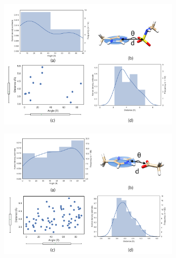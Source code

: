 \documentclass[a4paper, 12pt, openany]{book}
\begin{document}
\begin{figure}
    \centering
    \includegraphics[width=9cm]{Figures/Datamining/his_Nsulf.png}
    \caption{
    }
    \label{fig:my_label}
\end{figure}

\begin{figure}
    \centering
    \includegraphics[width=9cm]{Figures/Datamining/his_carb.png}
    \caption{
    }
    \label{fig:my_label}
\end{figure}
\end{document}

